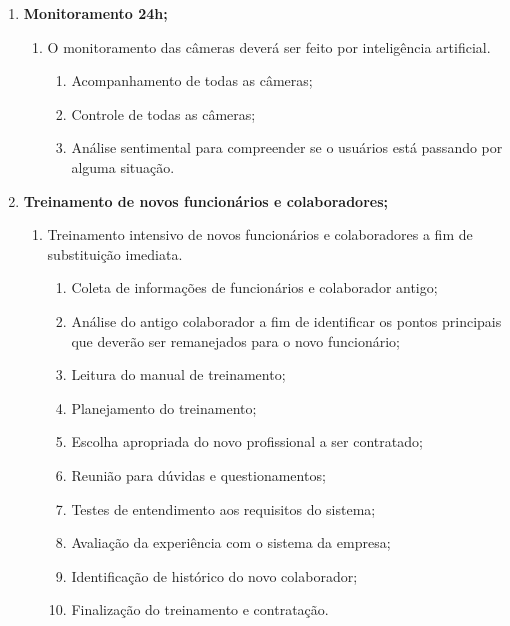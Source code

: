 \begin{enumerate}
\begin{enumerate}
\begin{enumerate}
                        \end{enumerate}
            \end{enumerate}

      \item \textbf{Monitoramento 24h;}
            \begin{enumerate}

                  \item	O monitoramento das câmeras deverá ser feito por inteligência artificial.

                        \begin{enumerate}
                              \item Acompanhamento de todas as câmeras;
                              \item Controle de todas as câmeras;
                              \item Análise sentimental para compreender se o usuários está passando por alguma situação.

                        \end{enumerate}
            \end{enumerate}

      \item \textbf{Treinamento de novos funcionários e colaboradores;}
            \begin{enumerate}

                  \item	Treinamento intensivo de novos funcionários e colaboradores a fim de substituição imediata.

                        \begin{enumerate}
                              \item Coleta de informações de funcionários e colaborador antigo;
                              \item Análise do antigo colaborador a fim de identificar os pontos principais que deverão ser remanejados para o novo funcionário;
                              \item Leitura do manual de treinamento;
                              \item Planejamento do treinamento;
                              \item Escolha apropriada do novo profissional a ser contratado;
                              \item Reunião para dúvidas e questionamentos;
                              \item Testes de entendimento aos requisitos do sistema;
                              \item Avaliação da experiência com o sistema da empresa;
                              \item Identificação de histórico do novo colaborador;
                              \item Finalização do treinamento e contratação.


\end{enumerate}
\end{enumerate}
\end{enumerate}
